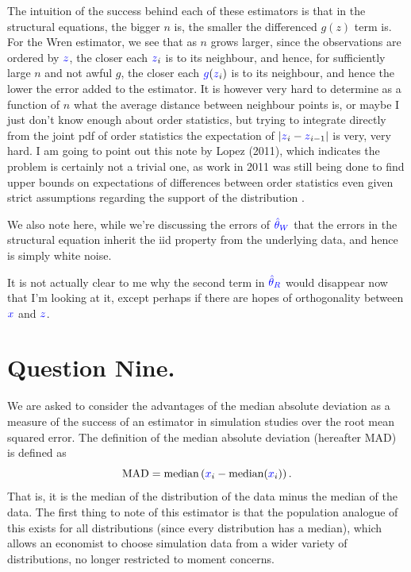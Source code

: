 \documentclass{article}
\renewcommand{\r}[1]{\textcolor{blue}{#1}}
\begin{document}
The intuition of the success behind each of these estimators is that in the structural equations, the bigger $n$ is, the smaller the differenced $g(z)$ term is. For the Wren estimator, we see that as $n$ grows larger, since the observations are ordered by $\r{z}$, the closer each $\r{z}_{i}$ is to its neighbour, and hence, for sufficiently large $n$ and not awful $g$, the closer each $\r{g}(\r{z}_{i})$ is to its neighbour, and hence the lower the error added to the estimator. It is however very hard to determine as a function of $n$ what the average distance between neighbour points is, or maybe I just don't know enough about order statistics, but trying to integrate directly from the joint pdf of order statistics the expectation of $|\r{z}_{i}-\r{z}_{i-1}|$ is very, very hard. I am going to point out this note by Lopez (2011), which indicates the problem is certainly not a trivial one, as work in 2011 was still being done to find upper bounds on expectations of differences between order statistics even given strict assumptions regarding the support of the distribution \cite{lopez2011}.

We also note here, while we're discussing the errors of $\r{\hat{\theta}_{W}}$ that the errors in the structural equation inherit the iid property from the underlying data, and hence is simply white noise.

It is not actually clear to me why the second term in $\r{\hat{\theta}_{R}}$ would disappear now that I'm looking at it, except perhaps if there are hopes of orthogonality between $\r{x}$ and $\r{z}$.



\section{Question Nine.}
We are asked to consider the advantages of the median absolute deviation as a measure of the success of an estimator in simulation studies over the root mean squared error. The definition of the median absolute deviation (hereafter MAD) is defined\cite{leys2013} as
\begin{equation} \text{MAD} = \text{median}\left(\r{x}_{i}-\text{median}(\r{x}_{i})\right).\end{equation}
That is, it is the median of the distribution of the data minus the median of the data. The first thing to note of this estimator is that the population analogue of this exists for all distributions (since every distribution has a median), which allows an economist to choose simulation data from a wider variety of distributions, no longer restricted to moment concerns.
\end{document}
